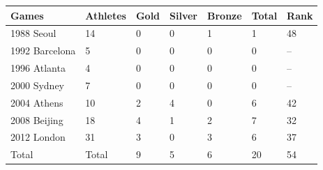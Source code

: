 \documentclass{article}
\begin{document}
\begin{tabular}{lllllll}
\toprule
Games & Athletes & Gold & Silver & Bronze & Total & Rank \\
\midrule
1988 Seoul & 14 & 0 & 0 & 1 & 1 & 48 \\
1992 Barcelona & 5 & 0 & 0 & 0 & 0 & – \\
1996 Atlanta & 4 & 0 & 0 & 0 & 0 & – \\
2000 Sydney & 7 & 0 & 0 & 0 & 0 & – \\
2004 Athens & 10 & 2 & 4 & 0 & 6 & 42 \\
2008 Beijing & 18 & 4 & 1 & 2 & 7 & 32 \\
2012 London & 31 & 3 & 0 & 3 & 6 & 37 \\
Total & Total & 9 & 5 & 6 & 20 & 54 \\
\bottomrule
\end{tabular}
\end{document}
